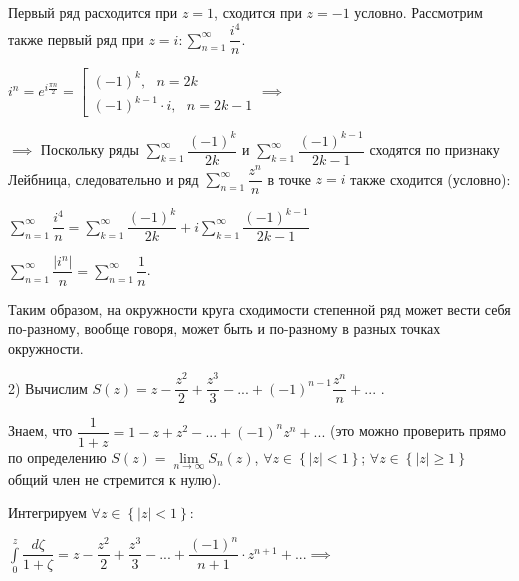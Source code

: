 \documentclass[a4paper, 12pt]{article}
\begin{document}
  \quad Первый ряд расходится при $z=1$, сходится при $z = -1$ условно. Рассмотрим также первый ряд при $z = i : \displaystyle\sum\limits_{n=1}^{\infty} \dfrac{i^4}{n}$. 

  \begin{center}
    $i^n = e^{i\frac{\pi n}{2}} = \left[ 
    \begin{array}{c}
      (-1)^k, \text{ } n =2k \\
      (-1)^{k-1} \cdot i, \text{ } n =2k -1
    \end{array} \right. \implies $
  \end{center}
  
  \quad $\implies$ Поскольку ряды $\displaystyle\sum\limits_{k=1}^{\infty} \dfrac{(-1)^k}{2k}$ и $\displaystyle\sum\limits_{k=1}^{\infty} \dfrac{(-1)^{k-1}}{2k-1}$ сходятся по признаку Лейбница, следовательно и ряд $\displaystyle\sum\limits_{n=1}^{\infty} \dfrac{z^n}{n}$ в точке $z = i$ также сходится (условно):

  \begin{center}
    $\displaystyle\sum\limits_{n=1}^{\infty} \dfrac{i^4}{n} = \displaystyle\sum\limits_{k=1}^{\infty}\dfrac{(-1)^k}{2k} + i\displaystyle\sum\limits_{k=1}^{\infty} \dfrac{(-1)^{k-1}}{2k-1}$

    $\displaystyle\sum\limits_{n=1}^{\infty} \dfrac{|i^n|}{n} = \displaystyle\sum\limits_{n=1}^{\infty} \dfrac{1}{n}$.
  \end{center}
  
  \quad Таким образом, на окружности круга сходимости степенной ряд может вести себя по-разному, вообще говоря, может быть и по-разному в разных точках окружности.

  2) Вычислим $S(z) = z - \dfrac{z^2}{2} + \dfrac{z^3}{3} - ... + (-1)^{n-1} \dfrac{z^n}{n} + ...$ .

  \quad Знаем, что $\dfrac{1}{1+z} = 1 - z + z^2 - ... + (-1)^n z^n + ...$ (это можно проверить прямо по определению $S(z) = \lim\limits_{n \to \infty} S_n(z)$, $\forall z \in \left\{ |z| < 1 \right\}$; $\forall z \in \left\{ |z| \geq 1\right\}$ общий член не стремится к нулю).

  \quad Интегрируем $\forall z \in \left\{ |z| < 1 \right\}$:

  \begin{center}
    $\displaystyle\int\limits_{0}^{z} \dfrac{d\zeta}{1 + \zeta} = z - \dfrac{z^2}{2} + \dfrac{z^3}{3} - ... + \dfrac{(-1)^n}{n+1}\cdot z^{n+1} + ... \implies$
  \end{center}
\end{document}
